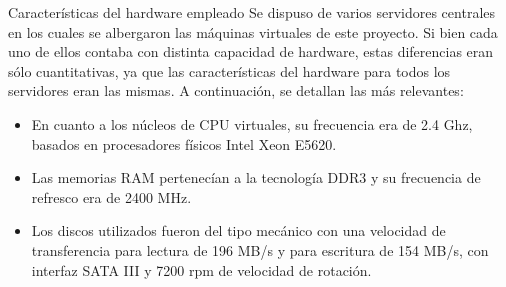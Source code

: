     \pagebreak
    \begin{subsubsection}{Características del hardware empleado}
    Se dispuso de varios servidores centrales en los cuales se albergaron las máquinas virtuales de este proyecto. Si bien cada uno de ellos contaba con distinta capacidad de hardware, estas diferencias eran sólo cuantitativas, ya que las características del hardware para todos los servidores eran las mismas. A continuación, se detallan las más relevantes:
   \begin{itemize}
    \item En cuanto a los núcleos de CPU virtuales, su frecuencia era de 2.4 Ghz, basados en procesadores físicos Intel Xeon E5620.
    \item Las memorias RAM pertenecían a la tecnología DDR3 y su frecuencia de refresco era de 2400 MHz.
    \item Los discos utilizados fueron del tipo mecánico con una velocidad de transferencia para lectura de 196 MB/s y para escritura de 154 MB/s, con interfaz SATA III y 7200 rpm de velocidad de rotación.
    \end{itemize}
    \end{subsubsection}
    
